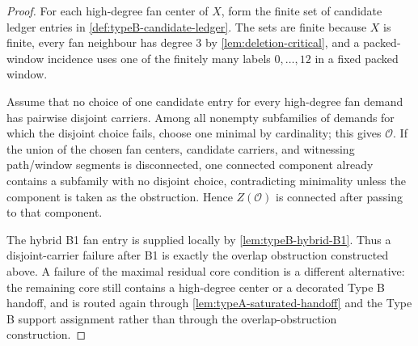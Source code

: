 \documentclass[11pt]{article}
\begin{document}
\begin{proof}
For each high-degree fan center of $X$, form the finite set of candidate ledger
entries in \cref{def:typeB-candidate-ledger}.  The sets are finite because $X$
is finite, every fan neighbour has degree $3$ by \cref{lem:deletion-critical},
and a packed-window incidence uses one of the finitely many labels
$0,\ldots,12$ in a fixed packed window.

Assume that no choice of one candidate entry for every high-degree fan demand
has pairwise disjoint carriers.  Among all nonempty subfamilies of demands for
which the disjoint choice fails, choose one minimal by cardinality; this gives
$\mathcal O$.  If the union of the chosen fan centers, candidate carriers, and
witnessing path/window segments is disconnected, one connected component already
contains a subfamily with no disjoint choice, contradicting minimality unless
the component is taken as the obstruction.  Hence $Z(\mathcal O)$ is connected
after passing to that component.

The hybrid B1 fan entry is supplied locally by
\cref{lem:typeB-hybrid-B1}.  Thus a disjoint-carrier failure after B1 is exactly
the overlap obstruction constructed above.  A failure of the maximal residual
core condition is a different alternative: the remaining core still contains a
high-degree center or a decorated Type B handoff, and is routed again through
\cref{lem:typeA-saturated-handoff} and the Type B support assignment rather than
through the overlap-obstruction construction.
\end{proof}
\end{document}
